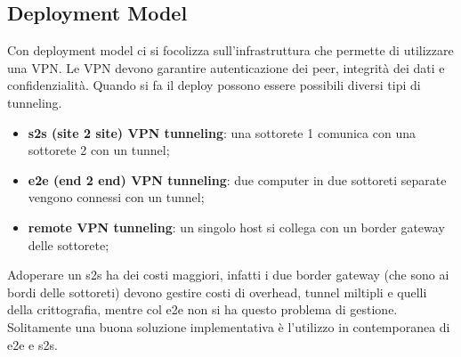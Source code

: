 \documentclass[12pt]{article}
\begin{document}
\subsection{Deployment Model}
Con deployment model ci si focolizza sull'infrastruttura che permette di utilizzare una VPN. Le VPN devono garantire autenticazione dei peer, integrit\`a dei dati e confidenzialit\`a. Quando si fa il deploy possono essere possibili diversi tipi di tunneling.
\begin{itemize}
    \item \textbf{s2s (site 2 site) VPN tunneling}: una sottorete 1 comunica con una sottorete 2 con un tunnel;
    \item \textbf{e2e (end 2 end) VPN tunneling}: due computer in due sottoreti separate vengono connessi con un tunnel;
    \item \textbf{remote VPN tunneling}: un singolo host si collega con un border gateway delle sottorete;
\end{itemize}
Adoperare un s2s ha dei costi maggiori, infatti i due border gateway (che sono ai bordi delle sottoreti) devono gestire costi di overhead, tunnel miltipli e quelli della crittografia, mentre col e2e non si ha questo problema di gestione. Solitamente una buona soluzione implementativa \`e l'utilizzo in contemporanea di e2e e s2s.
\end{document}
